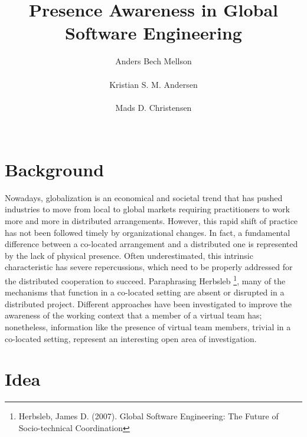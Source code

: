 \documentclass{sigchi}
\begin{document}
\title{Presence Awareness in Global Software Engineering}

\author{
  \alignauthor Anders Bech Mellson\\
    \\
  \alignauthor Kristian S. M. Andersen\\
    \\
  \alignauthor Mads D. Christensen\\
    \\
}

\maketitle



\section{Background}

Nowadays, globalization is an economical and societal trend that has pushed industries to move from local to global markets requiring practitioners to work more and more in distributed arrangements.  However, this rapid shift of practice has not been followed timely by organizational changes. In fact, a fundamental difference between a co-located arrangement and a distributed one is represented by the lack of physical presence.  Often underestimated, this intrinsic characteristic has severe repercussions, which need to be properly addressed for the distributed cooperation to succeed.
Paraphrasing Herbsleb \footnote{Herbsleb, James D. (2007). Global Software Engineering: The Future of Socio-technical Coordination}, many of the mechanisms that function in a co-located setting are absent or disrupted in a distributed project. Different approaches have been investigated to improve the awareness of the working context that a member of a virtual team has; nonetheless, information like the presence of virtual team members, trivial in a co-located setting, represent an interesting open area of investigation.

\section{Idea}
\end{document}
